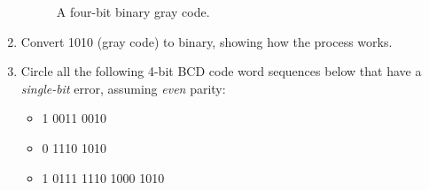 \documentclass{article}
\begin{document}
\begin{enumerate}
\begin{figure}[hb]
\caption{\label{fig:gray} A four-bit binary gray code.}
\end{figure}
\item Convert 1010 (gray code) to binary, showing how the process works. \\ \vspace{0.5cm}
\item Circle all the following 4-bit BCD code word sequences below that have a \textit{single-bit} error, assuming \textit{even} parity:
\begin{itemize}
\item 1 0011 0010
\item 0 1110 1010
\item 1 0111 1110 1000 1010
\end{itemize}
\end{enumerate}
\end{document}
